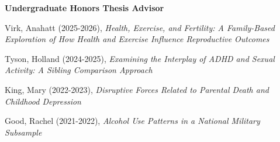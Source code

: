 {\large\textbf{Undergraduate Honors Thesis Advisor}}
\begin{etaremune}%
\item Virk, Anahatt (2025-2026), \textit{Health, Exercise, and Fertility: A Family-Based Exploration of How Health and Exercise Influence Reproductive Outcomes}
\item Tyson, Holland (2024-2025), \textit{Examining the Interplay of ADHD and Sexual Activity: A Sibling Comparison Approach}
\item King, Mary (2022-2023), \textit{Disruptive Forces Related to Parental Death and Childhood Depression} %
\item Good, Rachel (2021-2022), \textit{Alcohol Use Patterns in a National Military Subsample} %
\end{etaremune}%

